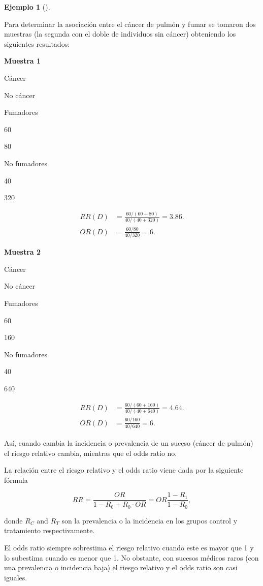 \documentclass[
  spanish,
  a4paper,
]{scrreport}
\theoremstyle{plain}
\theoremstyle{definition}
\newtheorem{example}{Ejemplo}[chapter]
\theoremstyle{definition}
\theoremstyle{remark}
\begin{document}
\begin{example}[]\protect\hypertarget{exm-riesgo-relativo-vs-odds-ratio}{}\label{exm-riesgo-relativo-vs-odds-ratio}

Para determinar la asociación entre el cáncer de pulmón y fumar se
tomaron dos muestras (la segunda con el doble de individuos sin cáncer)
obteniendo los siguientes resultados:

\textbf{Muestra 1}

Cáncer

No cáncer

Fumadores

60

80

No fumadores

40

320

\begin{align*}
RR(D) &= \frac{60/(60+80)}{40/(40+320)} = 3.86.\\
OR(D) &= \frac{60/80}{40/320} = 6. 
\end{align*}

\textbf{Muestra 2}

Cáncer

No cáncer

Fumadores

60

160

No fumadores

40

640

\begin{align*}
RR(D) &= \frac{60/(60+160)}{40/(40+640)} = 4.64.\\
OR(D) &= \frac{60/160}{40/640} = 6. 
\end{align*}

Así, cuando cambia la incidencia o prevalencia de un suceso (cáncer de
pulmón) el riesgo relativo cambia, mientras que el odds ratio no.

\end{example}

La relación entre el riesgo relativo y el odds ratio viene dada por la
siguiente fórmula

\[RR = \frac{OR}{1-R_0+R_0\cdot OR} = OR \frac{1-R_1}{1-R_0},\]

donde \(R_C\) and \(R_T\) son la prevalencia o la incidencia en los
grupos control y tratamiento respectivamente.

El odds ratio siempre sobrestima el riesgo relativo cuando este es mayor
que 1 y lo subestima cuando es menor que 1. No obstante, con sucesos
médicos raros (con una prevalencia o incidencia baja) el riesgo relativo
y el odds ratio son casi iguales.
\end{document}
